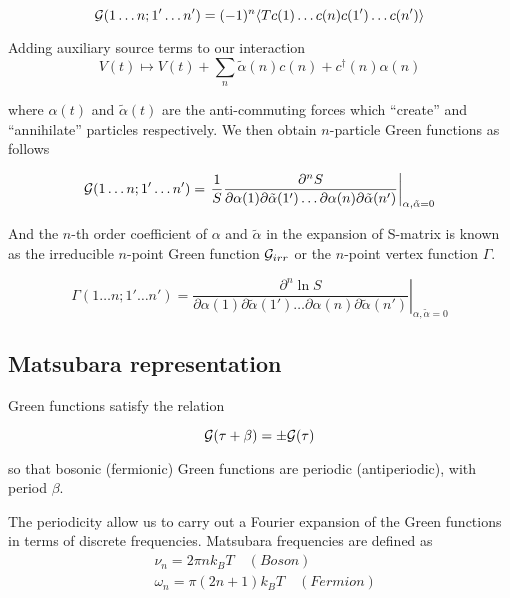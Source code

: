 \begin{equation} \mathcal{G}(1\dots n;1'\dots n') = (-1)^n\langle T c(1)\dots c(n)c(1')\dots c(n')\rangle \end{equation}

Adding auxiliary source terms to our interaction
\begin{equation} V(t) \mapsto V(t) + \sum_n \tilde{\alpha}(n)c(n)+c^\dagger(n) \alpha(n) \end{equation} 

where $\alpha(t)$ and $\tilde{\alpha}(t)$ are the anti-commuting forces which ``create'' and ``annihilate'' particles respectively.
We then obtain $n$-particle Green functions as follows

\begin{equation} \mathcal{G}(1\dots n;1'\dots n') = \left.\frac{1}{S}\frac{\partial^n S}{\partial\alpha(1)\partial\tilde{\alpha}(1')\dots \partial\alpha(n)\partial\tilde{\alpha}(n')}\right|_{\alpha,\tilde{\alpha}=0} \end{equation}

And the $n$-th order coefficient of $\alpha$ and $\tilde{\alpha}$ in the expansion of S-matrix
is known as the irreducible $n$-point Green function $\mathcal{G}_{irr}$ or the $n$-point vertex function $\Gamma$.

\begin{equation} \Gamma(1\dots n;1'\dots n') = \left.\frac{\partial^n \ln{S}}{\partial\alpha(1)\partial\tilde{\alpha}(1')\dots \partial\alpha(n)\partial\tilde{\alpha}(n')}\right|_{\alpha,\tilde{\alpha}=0} \end{equation}

\subsection{Matsubara representation}
\label{sec:matsubara}
Green functions satisfy the relation

\begin{equation} \mathcal{G}(\tau+\beta) = \pm \mathcal{G}(\tau) \end{equation}

so that bosonic (fermionic) Green functions are periodic (antiperiodic), with period $\beta$.

The periodicity allow us to carry out a Fourier expansion of the Green functions in terms of discrete frequencies.
Matsubara frequencies are defined as
\begin{align}
  & \nu_n = 2\pi n k_B T \quad (Boson) \\ 
  & \omega_n = \pi(2n+1)k_B T \quad (Fermion)
\end{align}

